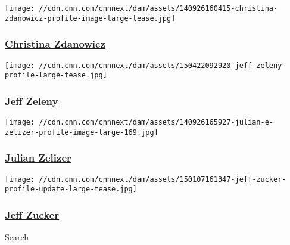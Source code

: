 \href{/profiles/christina-zdanowicz-profile}{}

\texttt{[image: //cdn.cnn.com/cnnnext/dam/assets/140926160415-christina-zdanowicz-profile-image-large-tease.jpg]}

\hypertarget{christina-zdanowicz}{%
\subsubsection{\texorpdfstring{\href{/profiles/christina-zdanowicz-profile}{Christina
Zdanowicz}}{Christina Zdanowicz}}\label{christina-zdanowicz}}

\href{/profiles/jeff-zeleny-profile}{}

\texttt{[image: //cdn.cnn.com/cnnnext/dam/assets/150422092920-jeff-zeleny-profile-large-tease.jpg]}

\hypertarget{jeff-zeleny}{%
\subsubsection{\texorpdfstring{\href{/profiles/jeff-zeleny-profile}{Jeff
Zeleny}}{Jeff Zeleny}}\label{jeff-zeleny}}

\href{/profiles/julian-zelizer}{}

\texttt{[image: //cdn.cnn.com/cnnnext/dam/assets/140926165927-julian-e-zelizer-profile-image-large-169.jpg]}

\hypertarget{julian-zelizer-}{%
\subsubsection{\texorpdfstring{\href{/profiles/julian-zelizer}{Julian
Zelizer }}{Julian Zelizer }}\label{julian-zelizer-}}

\href{/profiles/jeff-zucker-profile}{}

\texttt{[image: //cdn.cnn.com/cnnnext/dam/assets/150107161347-jeff-zucker-profile-update-large-tease.jpg]}

\hypertarget{jeff-zucker}{%
\subsubsection{\texorpdfstring{\href{/profiles/jeff-zucker-profile}{Jeff
Zucker}}{Jeff Zucker}}\label{jeff-zucker}}

Search

